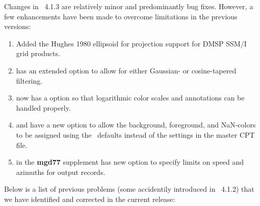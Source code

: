 Changes in \GMT\ 4.1.3 are relatively minor and predominantly bug fixes.  However, a few enhancements
have been made to overcome limitations in the previous versions:

\begin{enumerate}
\item Added the Hughes 1980 ellipsoid for projection support for DMSP SSM/I grid products.
\item {} has an extended  option to allow for either Gaussian- or
cosine-tapered filtering.
\item {} now has a  option so that logarithmic color scales and annotations
can be handled properly.
\item {} and  have a new  option to allow the background, foreground, and
NaN-colors to be assigned using the \GMT\ defaults instead of the settings in the master CPT file. 
\item {} in the {\bf mgd77} supplement has new option  to specify limits on
speed and azimuths for output records.
\end{enumerate}

Below is a list of previous problems (some accidentily introduced in \gmt\ 4.1.2)
that we have identified and corrected in the current release:

